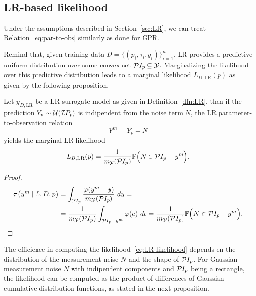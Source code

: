 \subsection{LR-based likelihood}\label{sec:LRlike}

Under the assumptions described in Section~\ref{sec:LR}, we can treat Relation~\eqref{eq:par-to-obs} similarly as done for GPR. 

Remind that, given training data $D =\{ (p_i, \tau_i, y_i) \}_{i=1}^n$, LR provides a predictive uniform distribution over some convex set $\mathcal PI_p \subseteq \mathcal Y $.
Marginalizing the likelihood over this predictive distribution leads to a marginal likelihood $L_{D, \text{LR}}(p)$ as given by the following proposition.

\begin{prp}\label{prp:LR-likelihood}
    Let $y_{D, \text{LR}}$ be a LR surrogate model as given in Definition~\ref{dfn:LR}, then if the prediction $Y_p \sim \mathcal U (\mathcal IP_p)$ is indipendent from the noise term $N$, the LR parameter-to-observation relation 
    \begin{equation*}
        Y^m = Y_p + N 
    \end{equation*}
    yields the marginal LR likelihood
    \begin{equation}\label{eq:LR-likelihood}
        L_{D, \text{LR}}(p) = \frac{1}{m_\mathcal Y (\mathcal PI_p)} \mathbb P \Big ( N \in \mathcal PI_p - y^m \Big ).
    \end{equation}
\end{prp}
\begin{proof}
    \begin{align*}
        \pi\big (y^m \mid L, D, p \big ) &= \int_{\mathcal P I_p } \frac{\varphi(y^m - y)}{m_\mathcal Y (\mathcal PI_p)} \ dy = \\
        & = \frac{1}{m_\mathcal Y (\mathcal PI_p)} \int_{\mathcal P I_p  - y^m} \varphi(e )  \ de  = \frac{1}{m_\mathcal Y (\mathcal PI_p)} \mathbb P \Big ( N \in   \mathcal PI_p - y^m \Big  ). \notag
    \end{align*}
\end{proof}

The efficience in computing the likelihood~\eqref{eq:LR-likelihood} depends on the distribution of the measurement noise $N$ and the shape of $\mathcal P I_p  $.
For Gaussian measurement noise $N$ with indipendent components and $\mathcal PI_p$ being a rectangle, the likelihood can be computed as the product of differences of Gaussian cumulative distribution functions, as stated in the next proposition.

